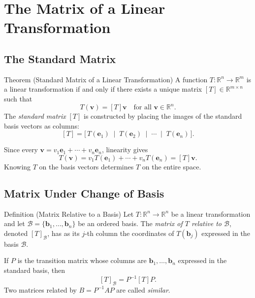 
\section{The Matrix of a Linear Transformation}

\subsection*{The Standard Matrix}

\begin{theorembox}{Theorem (Standard Matrix of a Linear Transformation)}
A function $T : \mathbb{R}^n \to \mathbb{R}^m$ is a linear transformation if and only if
there exists a unique matrix $[T] \in \mathbb{R}^{m \times n}$ such that
\[
  T(\mathbf{v}) = [T]\mathbf{v} \quad \text{for all } \mathbf{v} \in \mathbb{R}^n.
\]
The \emph{standard matrix} $[T]$ is constructed by placing the images of
the standard basis vectors as columns:
\[
  [T] = \bigl[\, T(\mathbf{e}_1) \;\mid\; T(\mathbf{e}_2) \;\mid\; \cdots \;\mid\; T(\mathbf{e}_n) \,\bigr].
\]
\end{theorembox}

\begin{remark*}
Since every $\mathbf{v} = v_1\mathbf{e}_1 + \cdots + v_n\mathbf{e}_n$,
linearity gives
\[
  T(\mathbf{v}) = v_1 T(\mathbf{e}_1) + \cdots + v_n T(\mathbf{e}_n) = [T]\mathbf{v}.
\]
Knowing $T$ on the basis vectors determines $T$ on the entire space.
\end{remark*}

\subsection*{Matrix Under Change of Basis}

\begin{propositionbox}{Definition (Matrix Relative to a Basis)}
Let $T : \mathbb{R}^n \to \mathbb{R}^n$ be a linear transformation and let
$\mathcal{B} = \{\mathbf{b}_1, \ldots, \mathbf{b}_n\}$ be an ordered basis.
The \emph{matrix of $T$ relative to $\mathcal{B}$}, denoted $[T]_\mathcal{B}$,
has as its $j$-th column the coordinates of $T(\mathbf{b}_j)$ expressed in the
basis $\mathcal{B}$.

If $P$ is the transition matrix whose columns are $\mathbf{b}_1, \ldots, \mathbf{b}_n$
expressed in the standard basis, then
\[
  [T]_\mathcal{B} = P^{-1} [T] P.
\]
Two matrices related by $B = P^{-1}AP$ are called \emph{similar}.
\end{propositionbox}

